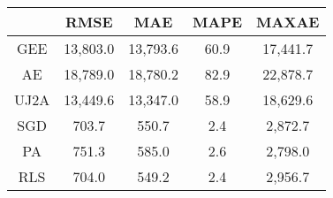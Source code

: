\begin{tabular}{ccccc}
\toprule
{} &      RMSE &       MAE &  MAPE &     MAXAE \\
\midrule
GEE  &  13,803.0 &  13,793.6 &  60.9 &  17,441.7 \\
AE   &  18,789.0 &  18,780.2 &  82.9 &  22,878.7 \\
UJ2A &  13,449.6 &  13,347.0 &  58.9 &  18,629.6 \\
SGD  &     703.7 &     550.7 &   2.4 &   2,872.7 \\
PA   &     751.3 &     585.0 &   2.6 &   2,798.0 \\
RLS  &     704.0 &     549.2 &   2.4 &   2,956.7 \\
\bottomrule
\end{tabular}
